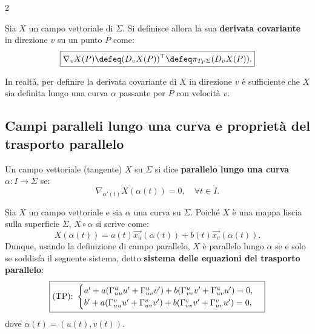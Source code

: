 \begin{multicols*}{2}
    \begin{definition}
        Sia $X$ un campo vettoriale di $\Sigma$. Si definisce allora
        la sua \textbf{derivata covariante} in direzione $v$ su un punto $P$ come:
        \[
            \boxed{\nabla_v X(P) \defeq (D_v X(P))^\top \defeq \pi_{T_P \Sigma}(D_v X(P)).}
        \]
    \end{definition}

    \begin{remark}
        In realtà, per definire la derivata covariante di $X$ in direzione $v$ è sufficiente
        che $X$ sia definita lungo una curva $\alpha$ passante per $P$ con velocità
        $v$.
    \end{remark}

    \subsection{Campi paralleli lungo una curva e proprietà del trasporto parallelo}

    \begin{definition}
        Un campo vettoriale (tangente) $X$ su $\Sigma$ si dice \textbf{parallelo lungo
            una curva $\alpha : I \to \Sigma$} se:
        \[
            \boxed{\nabla_{\alpha'(t)} X(\alpha(t)) = 0, \quad \forall t \in I.}
        \]
    \end{definition}

    \begin{remark}
        Sia $X$ un campo vettoriale e sia $\alpha$ una curva su $\Sigma$. Poiché
        $X$ è una mappa liscia sulla superficie $\Sigma$, $X \circ \alpha$
        si scrive come:
        \[
            X(\alpha(t)) = a(t) \vec{x_u}(\alpha(t)) + b(t) \vec{x_v}(\alpha(t)).
        \]
        Dunque, usando la definizione di campo parallelo, $X$ è parallelo lungo $\alpha$ se
        e solo se soddisfa il seguente sistema, detto \textbf{sistema delle equazioni del
            trasporto parallelo}:
        \begin{equation*} \label{eq:TP}
            \boxed{\textnormal{(TP):  } \begin{cases}
                    a' + a (\Gamma_{uu}^u u' + \Gamma_{uv}^u v') + b(\Gamma_{vv}^u v' + \Gamma_{uv}^u u') = 0, \\
                    b' + a (\Gamma_{uu}^v u' + \Gamma_{uv}^v v') + b(\Gamma_{vv}^v v' + \Gamma_{uv}^v u') = 0,
                \end{cases}}
        \end{equation*}
        dove $\alpha(t) = (u(t), v(t))$.
    \end{remark}


\end{multicols*}
